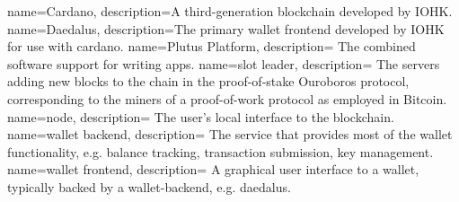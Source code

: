 {
  name=Cardano,
  description={A third-generation blockchain developed by IOHK.}
}
{
  name=Daedalus,
  description={The primary wallet frontend developed by IOHK for use with \gls{cardano}.}
}
{
  name=Plutus Platform,
  description={
    The combined software support for writing \glspl{app}.
  }
}
{
  name=slot leader,
  description={
    The servers adding new blocks to the chain in the proof-of-stake Ouroboros protocol, corresponding to the miners of a proof-of-work protocol as employed in Bitcoin.
  }
}
{
  name=node,
  description={
    The user's local interface to the blockchain.
  }
}
{
  name=wallet backend,
  description={
    The service that provides most of the wallet functionality, e.g. balance tracking, transaction submission, key management.
  }
}
{
  name=wallet frontend,
  description={
    A graphical user interface to a wallet, typically backed by a \gls{wallet-backend}, e.g. \gls{daedalus}.
  }
}

